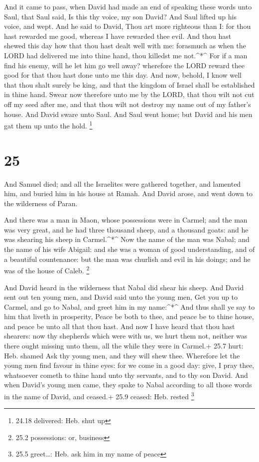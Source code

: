  And it came to pass, when David had made an end of
speaking these words unto Saul, that Saul said, Is this thy voice, my
son David? And Saul lifted up his voice, and wept.  And he
said to David, Thou art more righteous than I: for thou hast rewarded me
good, whereas I have rewarded thee evil.  And thou hast
shewed this day how that thou hast dealt well with me: forasmuch as when
the LORD had delivered me into thine hand, thou killedst me
not.\^{}*\^{}  For if a man find his enemy, will he let him
go well away? wherefore the LORD reward thee good for that thou hast
done unto me this day.  And now, behold, I know well that
thou shalt surely be king, and that the kingdom of Israel shall be
established in thine hand.  Swear now therefore unto me by
the LORD, that thou wilt not cut off my seed after me, and that thou
wilt not destroy my name out of my father's house.  And
David sware unto Saul. And Saul went home; but David and his men gat
them up unto the hold. \footnote{24.18 delivered: Heb. shut up}

\hypertarget{section-24}{%
\section{25}\label{section-24}}

 And Samuel died; and all the Israelites were gathered
together, and lamented him, and buried him in his house at Ramah. And
David arose, and went down to the wilderness of Paran.

 And there was a man in Maon, whose possessions were in
Carmel; and the man was very great, and he had three thousand sheep, and
a thousand goats: and he was shearing his sheep in Carmel.\^{}*\^{}
 Now the name of the man was Nabal; and the name of his wife
Abigail: and she was a woman of good understanding, and of a beautiful
countenance: but the man was churlish and evil in his doings; and he was
of the house of Caleb. \footnote{25.2 possessions: or, business}

 And David heard in the wilderness that Nabal did shear his
sheep.  And David sent out ten young men, and David said
unto the young men, Get you up to Carmel, and go to Nabal, and greet him
in my name:\^{}*\^{}  And thus shall ye say to him that
liveth in prosperity, Peace be both to thee, and peace be to thine
house, and peace be unto all that thou hast.  And now I have
heard that thou hast shearers: now thy shepherds which were with us, we
hurt them not, neither was there ought missing unto them, all the while
they were in Carmel.+ 25.7 hurt: Heb. shamed  Ask thy young
men, and they will shew thee. Wherefore let the young men find favour in
thine eyes: for we come in a good day: give, I pray thee, whatsoever
cometh to thine hand unto thy servants, and to thy son David.
 And when David's young men came, they spake to Nabal
according to all those words in the name of David, and ceased.+ 25.9
ceased: Heb. rested \footnote{25.5 greet\ldots: Heb. ask him in my name
  of peace}

